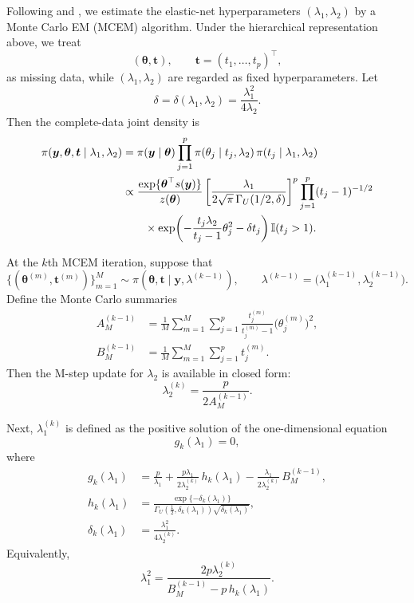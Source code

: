\documentclass[preprint,12pt,authoryear]{elsarticle}
\def\bs{\boldsymbol}
\def\th{\boldsymbol{\theta}}
\begin{document}
Following \citet{li2010bayesian} and \citet{casella2001empirical}, we estimate the
elastic-net hyperparameters \((\lambda_1,\lambda_2)\) by a Monte Carlo EM (MCEM)
algorithm. Under the hierarchical representation above, we treat
\[
(\th,\bs t), \qquad \bs t=(t_1,\dots,t_p)^\top,
\]
as missing data, while \((\lambda_1,\lambda_2)\) are regarded as fixed hyperparameters.
Let
\[
\delta=\delta(\lambda_1,\lambda_2)
=\frac{\lambda_1^2}{4\lambda_2}.
\]
Then the complete-data joint density is
\begin{align}
\pi(\bs y,\th,\bs t\mid \lambda_1,\lambda_2)
&=
\pi(\bs y\mid \th)
\prod_{j=1}^p
\pi(\theta_j\mid t_j,\lambda_2)\,
\pi(t_j\mid \lambda_1,\lambda_2)
\nonumber\\
&\propto
\frac{\exp\{\th^\top s(\bs y)\}}{z(\th)}
\left[
\frac{\lambda_1}
{2\sqrt{\pi}\,\Gamma_U(1/2,\delta)}
\right]^p
\prod_{j=1}^p
(t_j-1)^{-1/2}
\notag\\
&\qquad\times
\exp\!\left(
-\frac{t_j\lambda_2}{t_j-1}\theta_j^2
-\delta t_j
\right)
\mathbb I(t_j>1).
\label{eq:complete_data_density_lambda_main}
\end{align}


At the \(k\)th MCEM iteration, suppose that
\[
\bigl\{(\th^{(m)},\bs t^{(m)})\bigr\}_{m=1}^M
\sim
\pi(\th,\bs t\mid \bs y,\lambda^{(k-1)}),
\qquad
\lambda^{(k-1)}=\bigl(\lambda_1^{(k-1)},\lambda_2^{(k-1)}\bigr).
\]
Define the Monte Carlo summaries
\begin{align}
A_M^{(k-1)}
&=
\frac{1}{M}\sum_{m=1}^M
\sum_{j=1}^p
\frac{t_j^{(m)}}{t_j^{(m)}-1}\bigl(\theta_j^{(m)}\bigr)^2,
\label{eq:AM_main}
\\
B_M^{(k-1)}
&=
\frac{1}{M}\sum_{m=1}^M
\sum_{j=1}^p t_j^{(m)}.
\label{eq:BM_main}
\end{align}
Then the M-step update for \(\lambda_2\) is available in closed form:
\begin{equation}
\lambda_2^{(k)}
=
\frac{p}{2A_M^{(k-1)}}.
\label{eq:lambda2_update_main}
\end{equation}


Next, \(\lambda_1^{(k)}\) is defined as the positive solution of the one-dimensional
equation
\begin{equation}
g_k(\lambda_1)=0,
\label{eq:lambda1_root_main}
\end{equation}
where
\begin{align}
g_k(\lambda_1)
&=
\frac{p}{\lambda_1}
+\frac{p\lambda_1}{2\lambda_2^{(k)}}\,h_k(\lambda_1)
-\frac{\lambda_1}{2\lambda_2^{(k)}}\,B_M^{(k-1)},
\label{eq:gk_main}
\\
h_k(\lambda_1)
&=
\frac{\exp\{-\delta_k(\lambda_1)\}}
{\Gamma_U\!\left(\frac12,\delta_k(\lambda_1)\right)\sqrt{\delta_k(\lambda_1)}},
\label{eq:hm_main}
\\
\delta_k(\lambda_1)
&=
\frac{\lambda_1^2}{4\lambda_2^{(k)}}.
\label{eq:deltam_main}
\end{align}
Equivalently,
\begin{equation}
\lambda_1^2
=
\frac{2p\lambda_2^{(k)}}{
B_M^{(k-1)}
-p\,h_k(\lambda_1)
}.
\label{eq:lambda1_fixed_point_main}
\end{equation}
\end{document}
